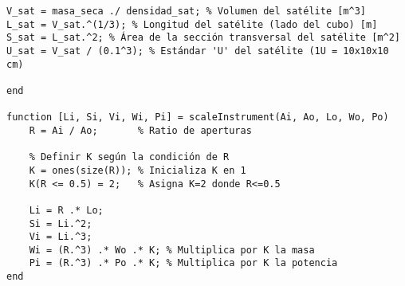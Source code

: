 \begin{verbatim}
V_sat = masa_seca ./ densidad_sat; % Volumen del satélite [m^3]
L_sat = V_sat.^(1/3); % Longitud del satélite (lado del cubo) [m]
S_sat = L_sat.^2; % Área de la sección transversal del satélite [m^2]
U_sat = V_sat / (0.1^3); % Estándar 'U' del satélite (1U = 10x10x10 cm)

end

function [Li, Si, Vi, Wi, Pi] = scaleInstrument(Ai, Ao, Lo, Wo, Po)
    R = Ai / Ao;       % Ratio de aperturas

    % Definir K según la condición de R
    K = ones(size(R)); % Inicializa K en 1
    K(R <= 0.5) = 2;   % Asigna K=2 donde R<=0.5

    Li = R .* Lo; 
    Si = Li.^2;
    Vi = Li.^3;
    Wi = (R.^3) .* Wo .* K; % Multiplica por K la masa
    Pi = (R.^3) .* Po .* K; % Multiplica por K la potencia
end


\end{verbatim}